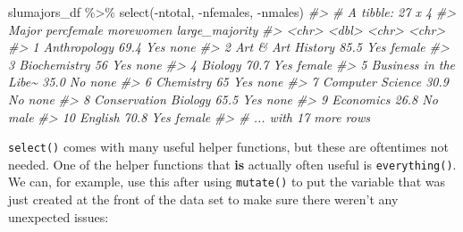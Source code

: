 \documentclass[
]{book}
\newenvironment{Shaded}{\begin{snugshade}}{\end{snugshade}}
\newcommand{\CommentTok}[1]{\textcolor[rgb]{0.56,0.35,0.01}{\textit{#1}}}
\newcommand{\FunctionTok}[1]{\textcolor[rgb]{0.00,0.00,0.00}{#1}}
\newcommand{\NormalTok}[1]{#1}
\newcommand{\SpecialCharTok}[1]{\textcolor[rgb]{0.00,0.00,0.00}{#1}}
\begin{document}
\begin{Shaded}
\begin{Highlighting}[]
\NormalTok{slumajors\_df }\SpecialCharTok{\%\textgreater{}\%} \FunctionTok{select}\NormalTok{(}\SpecialCharTok{{-}}\NormalTok{ntotal, }\SpecialCharTok{{-}}\NormalTok{nfemales, }\SpecialCharTok{{-}}\NormalTok{nmales)}
\CommentTok{\#\textgreater{} \# A tibble: 27 x 4}
\CommentTok{\#\textgreater{}    Major                 percfemale morewomen large\_majority}
\CommentTok{\#\textgreater{}    \textless{}chr\textgreater{}                      \textless{}dbl\textgreater{} \textless{}chr\textgreater{}     \textless{}chr\textgreater{}         }
\CommentTok{\#\textgreater{}  1 Anthropology                69.4 Yes       none          }
\CommentTok{\#\textgreater{}  2 Art \& Art History           85.5 Yes       female        }
\CommentTok{\#\textgreater{}  3 Biochemistry                56   Yes       none          }
\CommentTok{\#\textgreater{}  4 Biology                     70.7 Yes       female        }
\CommentTok{\#\textgreater{}  5 Business in the Libe\textasciitilde{}       35.0 No        none          }
\CommentTok{\#\textgreater{}  6 Chemistry                   65   Yes       none          }
\CommentTok{\#\textgreater{}  7 Computer Science            30.9 No        none          }
\CommentTok{\#\textgreater{}  8 Conservation Biology        65.5 Yes       none          }
\CommentTok{\#\textgreater{}  9 Economics                   26.8 No        male          }
\CommentTok{\#\textgreater{} 10 English                     70.8 Yes       female        }
\CommentTok{\#\textgreater{} \# ... with 17 more rows}
\end{Highlighting}
\end{Shaded}

\texttt{select()} comes with many useful helper functions, but these are oftentimes not needed. One of the helper functions that \textbf{is} actually often useful is \texttt{everything()}. We can, for example, use this after using \texttt{mutate()} to put the variable that was just created at the front of the data set to make sure there weren't any unexpected issues:
\end{document}
